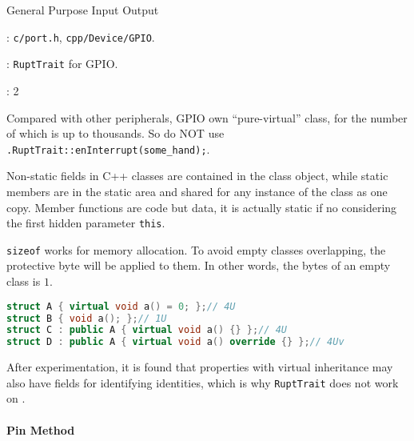 
General Purpose Input Output

: \verb`c/port.h`, \verb`cpp/Device/GPIO`.

: \verb`RuptTrait` for GPIO.

: 2

Compared with other peripherals, GPIO own ``pure-virtual'' class, for the number of which is up to thousands.
So do NOT use \verb`.RuptTrait::enInterrupt(some_hand);`.


Non-static fields in C++ classes are contained in the class object, while static members are in the static area and shared for any instance of the class as one copy.
Member functions are code but data, it is actually static if no considering the first hidden parameter \verb`this`.


\verb`sizeof` works for memory allocation. To avoid empty classes overlapping, the protective byte will be applied to them.
In other words, the bytes of an empty class is $1$.

\begin{lstlisting}[language=C++]
struct A { virtual void a() = 0; };// 4U
struct B { void a(); };// 1U
struct C : public A { virtual void a() {} };// 4U
struct D : public A { virtual void a() override {} };// 4Uv
\end{lstlisting}

After experimentation, it is found that properties with virtual inheritance may also have fields for identifying identities, which is why \verb`RuptTrait` does not work on .

\paragraph{Pin Method} \

